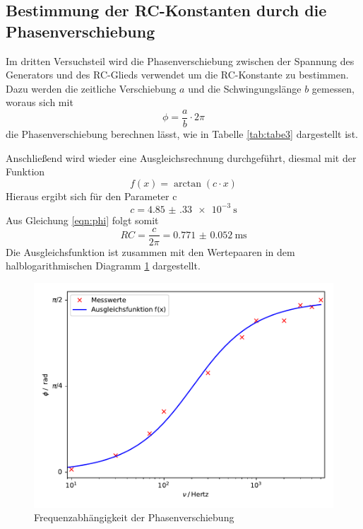 \subsection{Bestimmung der RC-Konstanten durch die Phasenverschiebung}
Im dritten Versuchsteil wird die Phasenverschiebung zwischen der Spannung
des Generators und des RC-Glieds verwendet um die RC-Konstante zu bestimmen. Dazu
werden die zeitliche Verschiebung $a$ und die Schwingungslänge $b$ gemessen,
woraus sich mit
\begin{equation}
  \phi = \frac{a}{b} \cdot 2\pi
\end{equation}
die Phasenverschiebung berechnen lässt, wie in Tabelle \ref{tab:tabe3}
dargestellt ist.

\noindent Anschließend wird wieder eine Ausgleichsrechnung durchgeführt, diesmal mit der
Funktion
\begin{equation}
  f(x) = \arctan (c \cdot x)
\end{equation}
Hieraus ergibt sich für den Parameter c
\begin{equation*}
  c = \SI{4.85(33)e-3}{\second}
\end{equation*}  
Aus Gleichung \ref{eqn:phi} folgt somit
\begin{equation}
   RC = \frac{c}{2\pi}= \SI{0.771(52)}{\milli\second}
\end{equation}
Die Ausgleichsfunktion ist zusammen mit den Wertepaaren in dem halblogarithmischen
Diagramm \ref{fig:phase} dargestellt.
\begin{figure}[H]
  \centering
  \includegraphics{plot3.pdf}
  \caption{Frequenzabhängigkeit der Phasenverschiebung}
  \label{fig:phase}
\end{figure}

